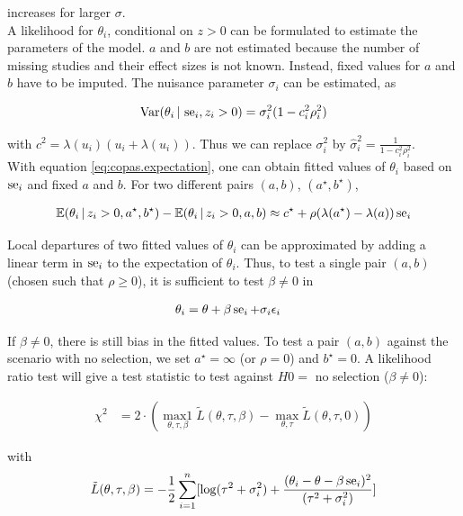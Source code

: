 \documentclass[11pt,a4paper,twoside]{book}\usepackage[]{graphicx}\usepackage[]{color}
\begin{document}
increases for larger $\sigma$.\\
A likelihood for $\theta_i$, conditional on $z>0$ can be formulated to estimate the parameters of the model. $a$ and $b$ are not estimated because the number of missing studies and their effect sizes is not known. Instead, fixed values for $a$ and $b$ have to be imputed.
The nuisance parameter $\sigma_i$ can be estimated, as

\begin{align}
\textrm{Var}(\theta_i\,\vert\, \operatorname{se}_i, z_i > 0) = \sigma_i^2 (1 - c_i^2\rho_i^2) \nonumber
\end{align}

with $c^2 = \lambda(u_i)(u_i + \lambda(u_i))$. Thus we can replace $\sigma_i^2$ by $\hat{\sigma}_i^2 = \frac{1}{1-c_i^2\rho_i^2}$. \\ 
With equation \eqref{eq:copas.expectation}, one can obtain fitted values of $\theta_i$ based on $\operatorname{se}_i$ and fixed $a$ and $b$. For two different pairs $(a,b)$, $(a^\star, b^\star)$,

\begin{align}
\mathbb{E}(\theta_i\,\vert\, z_i > 0, a^\star, b^\star) - \mathbb{E}(\theta_i\,\vert\, z_i > 0, a, b) \approx c^\star + \rho(\lambda(a^\star) - \lambda(a))\operatorname{se}_i \nonumber
\end{align}

Local departures of two fitted values of $\theta_i$ can be approximated by adding a linear term in $\operatorname{se}_i$ to the expectation of $\theta_i$. Thus, to test a single pair $(a,b)$ (chosen such that $\rho \geq 0$), it is sufficient to test $\beta \neq 0$ in

\begin{align}
\theta_i &= \theta + \beta \operatorname{se}_i + \sigma_i \epsilon_i \nonumber
\end{align}

If $\beta \neq 0$, there is still bias in the fitted values. To test a pair $(a,b)$ against the scenario with no selection, we set $a^\star = \infty$ (or $\rho = 0$) and $b^\star = 0$. A likelihood ratio test will give a test statistic to test against $H0 =$ no selection ($\beta \neq 0$):

\begin{align}
\chi^2 &= 2\cdot(\operatorname*{max1}_{\theta, \tau, \beta}\tilde{L}(\theta, \tau, \beta) - \operatorname*{max}_{\theta, \tau}\tilde{L}(\theta, \tau, 0)) \label{eq:copas.small.study}
\end{align}

with 
\begin{align}
\tilde{L}(\theta, \tau, \beta) = -\frac{1}{2}\sum_{i = 1}^n[\log(\tau^2 + \sigma_i^2) + \frac{(\theta_i - \theta - \beta \operatorname{se}_i)^2}{(\tau^2 + \sigma_i^2)}] \nonumber
\end{align}
\end{document}
